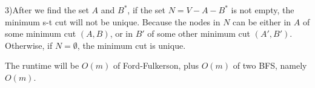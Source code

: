 \documentclass[letter,12pt]{article}
\begin{document}
3)After we find the set $A$ and $B^*$, if the set $N = V - A - B^*$ is not
empty, the minimum s-t cut will not be unique. Because the nodes in $N$
can be either in $A$ of some minimum cut $(A, B)$, or in $B'$ of some
other minimum cut $(A', B')$. Otherwise, if $N = \emptyset$, the minimum
cut is unique.

The runtime will be $O(m)$ of Ford-Fulkerson, plus $O(m)$ of two BFS,
namely $O(m)$. 
\end{document}
